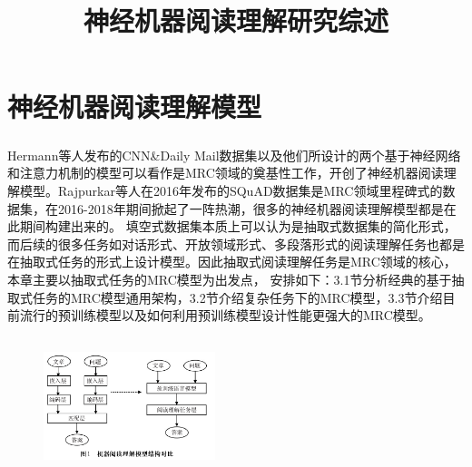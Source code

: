 \documentclass{article}
\title{\heiti \zihao{2} 神经机器阅读理解研究综述}
\date{}
\newcommand{\upcite}[1]{\textsuperscript{\textsuperscript{\cite{#1}}}}
\begin{document}
    \maketitle %

        




																																	



\section{神经机器阅读理解模型}
Hermann等人\upcite{Hermann}发布的CNN\&Daily Mail数据集以及他们所设计的两个基于神经网络和注意力机制的模型可以看作是MRC领域的奠基性工作，开创了神经机器阅读理解模型。Rajpurkar等人\cite{SQuAD1}在2016年发布的SQuAD数据集是MRC领域里程碑式的数据集，在2016-2018年期间掀起了一阵热潮，很多的神经机器阅读理解模型都是在此期间构建出来的。
填空式数据集本质上可以认为是抽取式数据集的简化形式，而后续的很多任务如对话形式、开放领域形式、多段落形式的阅读理解任务也都是在抽取式任务的形式上设计模型。因此抽取式阅读理解任务是MRC领域的核心，本章主要以抽取式任务的MRC模型为出发点，
安排如下：3.1节分析经典的基于抽取式任务的MRC模型通用架构，3.2节介绍复杂任务下的MRC模型，3.3节介绍目前流行的预训练模型以及如何利用预训练模型设计性能更强大的MRC模型。




%



%
%
%

\begin{figure}
	\centering
	\includegraphics[width=5cm,height=4cm]{classicTopre}
\end{figure}

\end{document}
